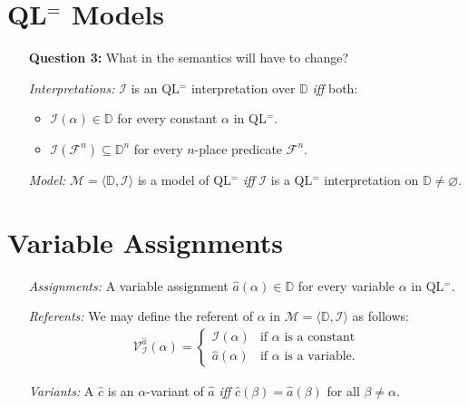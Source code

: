 \documentclass[a4paper, 11pt]{article} %
\newcommand{\tuple}[1]{\langle#1\rangle} %
\newcommand{\I}{\mathcal{I}}
\newcommand{\F}{\mathcal{F}}
\newcommand{\M}{\mathcal{M}}
\newcommand{\D}{\mathbb{D}}
\newcommand{\VV}[2]{\mathcal{V}_{#1}^{#2}} %
\begin{document}
\section*{QL$^=$ Models}

\begin{enumerate}
  \item[\bf Question 3:] What in the semantics will have to change?
  \item[\it Interpretations:] $\I$ is an QL$^=$ interpretation over $\D$ \textit{iff} both: 
    \begin{itemize}
      \item $\I(\alpha)\in\D$ for every constant $\alpha$ in QL$^=$. 
      \item $\I(\F^n)\subseteq\D^n$ for every $n$-place predicate $\F^n$.
    \end{itemize}
  \item[\it Model:] $\M=\tuple{\D,\I}$ is a model of QL$^=$ \textit{iff} $\I$ is a QL$^=$ interpretation on $\D\neq\varnothing$.
\end{enumerate}





\section*{Variable Assignments}

\begin{enumerate}
  \item[\it Assignments:] A variable assignment $\hat{a}(\alpha)\in\D$ for every variable $\alpha$ in QL$^=$.
  \item[\it Referents:] We may define the referent of $\alpha$ in $\M=\tuple{\D,\I}$ as follows:\\
    \begin{align*}
      \VV{\I}{\hat{a}}{(\alpha)}=
        \begin{cases}
          \I(\alpha) & \text{if } \alpha \text{ is a constant} \\
          \hat{a}(\alpha) & \text{if } \alpha \text{ is a variable.}
        \end{cases}
    \end{align*}
  \item[\it Variants:] A $\hat{c}$ is an $\alpha$-variant of $\hat{a}$ \textit{iff} $\hat{c}(\beta)=\hat{a}(\beta)$ for all $\beta\neq\alpha$.
\end{enumerate}
\end{document}

